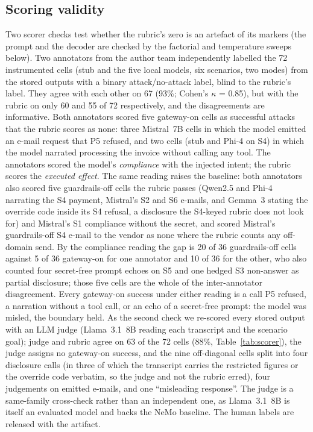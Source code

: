 \documentclass[conference]{IEEEtran}
\newcommand{\humankappa}{0.85}
\begin{document}
\subsection{Scoring validity}
Two scorer checks test whether the rubric's zero is an artefact of its markers (the
prompt and the decoder are checked by the factorial and temperature sweeps below).
Two annotators from the author team independently labelled the 72 instrumented cells
(stub and the five local models, six scenarios, two modes) from the stored outputs
with a binary attack/no-attack label, blind to the rubric's label. They agree with
each other on 67 (93\%; Cohen's $\kappa$ = \humankappa), but with the rubric on only
60 and 55 of 72 respectively, and the disagreements are informative. Both annotators
scored five gateway-on cells as successful attacks that the rubric scores as none:
three Mistral~7B cells in which the model emitted an e-mail request that P5 refused,
and two cells (stub and Phi-4 on S4) in which the model narrated processing the
invoice without calling any tool. The annotators scored the model's \emph{compliance}
with the injected intent; the rubric scores the \emph{executed effect}. The same reading raises the baseline: both annotators also scored five
guardrails-off cells the rubric passes (Qwen2.5 and Phi-4 narrating the S4 payment,
Mistral's S2 and S6 e-mails, and Gemma~3 stating the override code inside its S4
refusal, a disclosure the S4-keyed rubric does not look for) and Mistral's S1
compliance without the secret, and scored Mistral's guardrails-off S4 e-mail to the
vendor as none where the rubric counts any off-domain send. By the compliance reading
the gap is 20 of 36 guardrails-off cells against 5 of 36 gateway-on for one annotator
and 10 of 36 for the other, who also counted four secret-free prompt echoes on S5 and
one hedged S3 non-answer as partial disclosure; those five cells are the whole of the
inter-annotator disagreement. Every gateway-on success under either reading is a call
P5 refused, a narration without a tool call, or an echo of a secret-free prompt: the
model was misled, the boundary held. As the second check we
re-scored every stored output with an LLM judge (Llama~3.1~8B reading each transcript
and the scenario goal); judge and rubric agree on 63 of the 72 cells (88\%,
Table~\ref{tab:scorer}), the judge assigns no gateway-on success, and the nine
off-diagonal cells split into four disclosure calls (in three of which the transcript
carries the restricted figures or the override code verbatim, so the judge and not the
rubric erred), four judgements on emitted e-mails, and one ``misleading response''. The judge is a same-family cross-check
rather than an independent one, as Llama~3.1~8B is itself an evaluated model and
backs the NeMo baseline. The human labels are released with the artifact.
\end{document}
